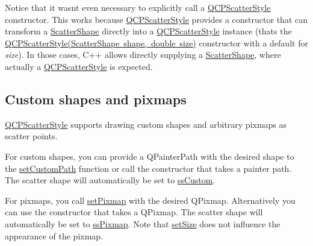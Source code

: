 \begin{DoxyCodeInclude}
\end{DoxyCodeInclude}
 Notice that it wasn\textquotesingle{}t even necessary to explicitly call a \mbox{\hyperlink{class_q_c_p_scatter_style}{Q\+C\+P\+Scatter\+Style}} constructor. This works because \mbox{\hyperlink{class_q_c_p_scatter_style}{Q\+C\+P\+Scatter\+Style}} provides a constructor that can transform a \mbox{\hyperlink{class_q_c_p_scatter_style_adb31525af6b680e6f1b7472e43859349}{Scatter\+Shape}} directly into a \mbox{\hyperlink{class_q_c_p_scatter_style}{Q\+C\+P\+Scatter\+Style}} instance (that\textquotesingle{}s the \mbox{\hyperlink{class_q_c_p_scatter_style_a003d92f74f4561eda111862eadd62f28}{Q\+C\+P\+Scatter\+Style(\+Scatter\+Shape shape, double size)}} constructor with a default for {\itshape size}). In those cases, C++ allows directly supplying a \mbox{\hyperlink{class_q_c_p_scatter_style_adb31525af6b680e6f1b7472e43859349}{Scatter\+Shape}}, where actually a \mbox{\hyperlink{class_q_c_p_scatter_style}{Q\+C\+P\+Scatter\+Style}} is expected.\hypertarget{class_q_c_p_scatter_style_QCPScatterStyle-custompath-and-pixmap}{}\subsection{Custom shapes and pixmaps}\label{class_q_c_p_scatter_style_QCPScatterStyle-custompath-and-pixmap}
\mbox{\hyperlink{class_q_c_p_scatter_style}{Q\+C\+P\+Scatter\+Style}} supports drawing custom shapes and arbitrary pixmaps as scatter points.

For custom shapes, you can provide a Q\+Painter\+Path with the desired shape to the \mbox{\hyperlink{class_q_c_p_scatter_style_a96a3e949f90b2afe5677ca9412a12a1e}{set\+Custom\+Path}} function or call the constructor that takes a painter path. The scatter shape will automatically be set to \mbox{\hyperlink{class_q_c_p_scatter_style_adb31525af6b680e6f1b7472e43859349a15d9bcfd9de94edda949006529f9219d}{ss\+Custom}}.

For pixmaps, you call \mbox{\hyperlink{class_q_c_p_scatter_style_a5fb611d46acfac520d7b89a1c71d9246}{set\+Pixmap}} with the desired Q\+Pixmap. Alternatively you can use the constructor that takes a Q\+Pixmap. The scatter shape will automatically be set to \mbox{\hyperlink{class_q_c_p_scatter_style_adb31525af6b680e6f1b7472e43859349a8718b849ca7c307b07b8e091efb0c31e}{ss\+Pixmap}}. Note that \mbox{\hyperlink{class_q_c_p_scatter_style_aaefdd031052892c4136129db68596e0f}{set\+Size}} does not influence the appearance of the pixmap. 

